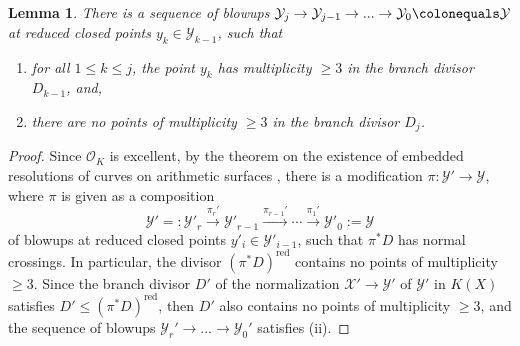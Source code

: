 \documentclass[12pt]{amsart}
\numberwithin{equation}{section}
\newtheorem{lemma}[equation]{Lemma}
\theoremstyle{definition}
\newcommand{\padma}[1]{{\color{Magenta} \sf $\clubsuit\clubsuit\clubsuit$ Padma: [#1]}}
\newcommand{\andrew}[1]{{\color{Green} \sf $\diamondsuit\diamondsuit\diamondsuit$ Andrew: [#1]}}
\renewcommand{\O}{\mathcal{O}}
\newcommand{\proj}{\mathbb P}
\newcommand{\X}{\mathcal{X}}
\newcommand{\Y}{\mathcal{Y}}
\newcommand{\tx}[1]{\text{#1}}
\begin{document}
    \begin{lemma}\label{lem:resolveinorder}
     There is a sequence of blowups $\Y_j\to\Y_{j-1}\to...\to\Y_0\colonequals \Y$ at reduced closed points $y_k \in \Y_{k-1}$, such that
     \begin{enumerate}[\upshape (i)]
        \item for all $1\leq k\leq j$, the point $y_k$ has multiplicity $\geq 3$ in the branch divisor $D_{k-1}$, and,
        \item there are no points of multiplicity $\geq 3$ in the branch divisor $D_j$.
    \end{enumerate}
    \end{lemma}
    \begin{proof}

    

    Since $\O_K$ is excellent, by the theorem on the existence of embedded
    resolutions of curves on arithmetic surfaces
    \cite[Theorems 9.2.26 and 9.2.2]{Liubook}, there is a modification $\pi \colon
    \Y' \to \Y$, where $\pi$ is given as a composition 
    $$\Y' =: \Y'_r \xrightarrow{\pi_r'} \Y'_{r-1} \xrightarrow{\pi_{r-1}'} \cdots \xrightarrow{\pi_1'} 
    \Y'_0 := \Y$$ of blowups at
    reduced closed points $y'_i \in \Y'_{i-1}$, such that $\pi^*D$
    has normal crossings. In particular, the divisor $(\pi^*D)^\tx{red}$ contains no points of multiplicity $\geq 3$. Since the branch divisor $D'$ of the normalization $\X'\to\Y'$ of $\Y'$ in $K(X)$ satisfies $D'\leq (\pi^*D)^\tx{red}$, then $D'$ also contains no points of multiplicity $\geq 3$, and the sequence of blowups $\Y_r'\to...\to\Y_0'$ satisfies (ii).


\end{proof}
\end{document}
